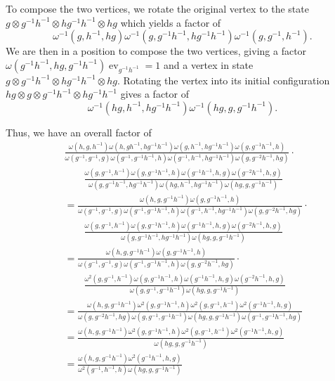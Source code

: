 \documentclass{amsart}
\DeclareMathOperator{\ev}{ev}
\begin{document}
To compose the two vertices, we rotate the original vertex to the state $g  \otimes g^{-1}h^{-1}  \otimes hg^{-1}h^{-1} \otimes hg$ which yields a factor of 
$$\omega^{-1}(g, h^{-1}, hg) \omega^{-1}(g, g^{-1}h^{-1}, hg^{-1}h^{-1}) \omega^{-1}(g, g^{-1}, h^{-1}).$$
We are then in a position to compose the two vertices, giving a factor 
$\omega(g^{-1}h^{-1}, hg, g^{-1}h^{-1})  \ev_{g^{-1}h^{-1}} = 1$ and a vertex in state $g \otimes g^{-1}h^{-1} \otimes hg^{-1}h^{-1} \otimes hg$.  Rotating the vertex into its initial configuration $hg \otimes g \otimes  g^{-1}h^{-1} \otimes hg^{-1}h^{-1}$ gives a factor 
of 
$$\omega^{-1}(hg, h^{-1}, hg^{-1}h^{-1}) \omega^{-1}(hg, g, g^{-1}h^{-1}).$$

 Thus, we have an overall factor of
{\allowdisplaybreaks
\begin{align*} 
&  \frac{\omega(h, g, h^{-1}) \omega(h, gh^{-1}, hg^{-1}h^{-1}) \omega(g, h^{-1}, hg^{-1}h^{-1}) \omega(g, g^{-1}h^{-1}, h) } 
{\omega(g^{-1}, g^{-1}, g) \omega(g^{-1}, g^{-1}h^{-1}, h) \omega(g^{-1}, h^{-1}, hg^{-1}h^{-1})  \omega(g, g^{-2}h^{-1}, hg)} \cdot \\ 
& \qquad  \frac{\omega(g, g^{-1}, h^{-1}) \omega(g, g^{-1}h^{-1}, h) \omega(g^{-1}h^{-1}, h, g) \omega(g^{-2}h^{-1}, h, g)}
{\omega(g, g^{-1}h^{-1}, hg^{-1}h^{-1}) \omega(hg, h^{-1}, hg^{-1}h^{-1}) \omega(hg, g, g^{-1}h^{-1})} \\
& = \frac{\omega(h, g, g^{-1}h^{-1})\omega(g, g^{-1}h^{-1}, h) } 
{\omega(g^{-1}, g^{-1}, g) \omega(g^{-1}, g^{-1}h^{-1}, h) \omega(g^{-1}, h^{-1}, hg^{-1}h^{-1})  \omega(g, g^{-2}h^{-1}, hg)} \cdot \\ 
& \qquad \frac{\omega(g, g^{-1}, h^{-1}) \omega(g, g^{-1}h^{-1}, h) \omega(g^{-1}h^{-1}, h, g) \omega(g^{-2}h^{-1}, h, g)}
{\omega(g, g^{-1}h^{-1}, hg^{-1}h^{-1}) \omega(hg, g, g^{-1}h^{-1}) } \\
& = \frac{\omega(h, g, g^{-1}h^{-1})\omega(g, g^{-1}h^{-1}, h) } 
{\omega(g^{-1}, g^{-1}, g) \omega(g^{-1}, g^{-1}h^{-1}, h)  \omega(g, g^{-2}h^{-1}, hg)} \cdot \\ 
& \qquad \frac{\omega^2(g, g^{-1}, h^{-1}) \omega(g, g^{-1}h^{-1}, h) \omega(g^{-1}h^{-1}, h, g) \omega(g^{-2}h^{-1}, h, g)}
{\omega(g, g^{-1}, g^{-1}h^{-1}) \omega(hg, g, g^{-1}h^{-1}) } \\
& = \frac{\omega(h, g, g^{-1}h^{-1})\omega^2(g, g^{-1}h^{-1}, h) \omega^2(g, g^{-1}, h^{-1})  \omega^2(g^{-1}h^{-1}, h, g)} 
{ \omega(g, g^{-2}h^{-1}, hg) \omega(g, g^{-1}, g^{-1}h^{-1}) \omega(hg, g, g^{-1}h^{-1}) \omega(g^{-1}, g^{-1}h^{-1}, hg)} \\
& = \frac{\omega(h, g, g^{-1}h^{-1})\omega^2(g, g^{-1}h^{-1}, h) \omega^2(g, g^{-1}, h^{-1}) \omega^2(g^{-1}h^{-1}, h, g) } 
{  \omega(hg, g, g^{-1}h^{-1}) } \\
& = \frac{\omega(h, g, g^{-1}h^{-1})  \omega^2(g^{-1}h^{-1}, h, g) } 
{\omega^2(g^{-1}, h^{-1},h)  \omega(hg, g, g^{-1}h^{-1}) } 
\end{align*}
}
\end{document}
